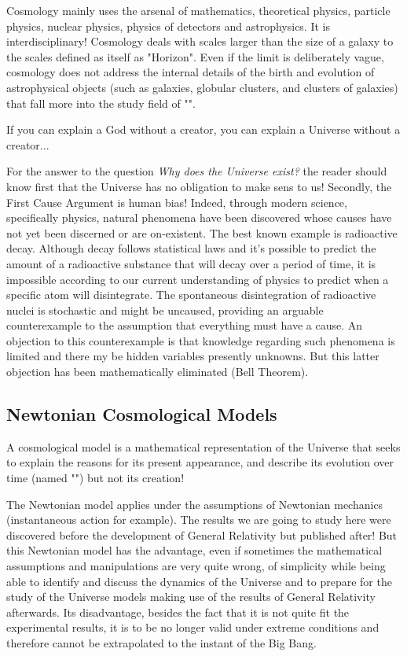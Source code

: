 	Cosmology mainly uses the arsenal of mathematics, theoretical physics, particle physics, nuclear physics, physics of detectors and astrophysics. It is interdisciplinary! Cosmology deals with scales larger than the size of a galaxy to the scales defined as itself as "Horizon". Even if the limit is deliberately vague, cosmology does not address the internal details of the birth and evolution of astrophysical objects (such as galaxies, globular clusters, and clusters of galaxies) that fall more into the study field of "".
	
	\begin{fquote}[]If you can explain a God without a creator, you can explain a Universe without a creator...
 	\end{fquote}
	\begin{tcolorbox}[title=Remark,colframe=black,arc=10pt]
	For the answer to the question \textit{Why does the Universe exist?} the reader should know first that the Universe has no obligation to make sens to us! Secondly, the First Cause Argument is human bias! Indeed, through modern science, specifically physics, natural phenomena have been discovered whose causes have not yet been discerned or are on-existent. The best known example is radioactive decay. Although decay follows statistical laws and it's possible to predict the amount of a radioactive substance that will decay over a period of time, it is impossible according to our current understanding of physics to predict when a specific atom will disintegrate. The spontaneous disintegration of radioactive nuclei is stochastic and might be uncaused, providing an arguable counterexample to the assumption that everything must have a cause.  An objection to this counterexample is that knowledge regarding such phenomena is limited and there my be hidden variables presently unknowns. But this latter objection has been mathematically eliminated (Bell Theorem).
	\end{tcolorbox}
	\subsection{Newtonian Cosmological Models}\label{newtonian cosmological models}
	A cosmological model is a mathematical representation of the Universe that seeks to explain the reasons for its present appearance, and describe its evolution over time (named "") but not its creation!
	
	The Newtonian model applies under the assumptions of Newtonian mechanics (instantaneous action for example). The results we are going to study here were discovered before the development of General Relativity but published after! But this Newtonian model has the advantage, even if sometimes the mathematical assumptions and manipulations are very quite wrong, of simplicity while being able to identify and discuss the dynamics of the Universe and to prepare for the study of the Universe models making use of the results of General Relativity afterwards. Its disadvantage, besides the fact that it is not quite fit the experimental results, it is to be no longer valid under extreme conditions and therefore cannot be extrapolated to the instant of the Big Bang.
	
